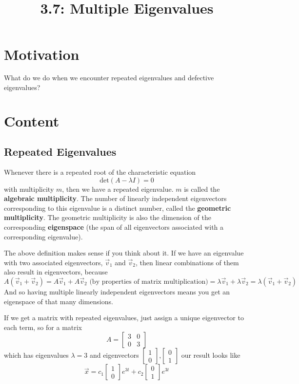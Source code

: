 \documentclass{article}
\title{3.7: Multiple Eigenvalues}
\begin{document}
\maketitle

\section{Motivation}
What do we do when we encounter repeated eigenvalues and defective eigenvalues?

\section{Content}

\subsection{Repeated Eigenvalues}

\begin{definition}
Whenever there is a repeated root of the characteristic equation $$\text{det}(A-\lambda I) = 0$$with multiplicity $m$, then we have a repeated eigenvalue. $m$ is called the \textbf{algebraic multiplicity}. The number of linearly independent eigenvectors corresponding to this eigenvalue is a distinct number, called the \textbf{geometric multiplicity}. The geometric multiplicity is also the dimension of the corresponding \textbf{eigenspace} (the span of all eigenvectors associated with a corresponding eigenvalue).  
\end{definition}
The above definition makes sense if you think about it. If we have an eigenvalue with two associated eigenvectors, $\vec{v}_1$ and $\vec{v}_2$, then linear combinations of them also result in eigenvectors, because $$A(\vec{v}_1 + \vec{v}_2) = A\vec{v}_1 + A\vec{v}_2 \text{ (by properties of matrix multiplication)} = \lambda\vec{v}_1 + \lambda\vec{v}_2 = \lambda(\vec{v}_1 + \vec{v}_2)$$And so having multiple linearly independent eigenvectors means you get an eigenspace of that many dimensions.

If we get a matrix with repeated eigenvalues, just assign a unique eigenvector to each term, so for a matrix $$A = \begin{bmatrix}
    3 & 0\\ 0 & 3
\end{bmatrix}$$which has eigenvalues $\lambda = 3$ and eigenvectors $\begin{bmatrix}
    1\\0
\end{bmatrix}$,$\begin{bmatrix}
    0\\1
\end{bmatrix}$ our result looks like $$\vec{x} = c_1\begin{bmatrix}
    1\\0
\end{bmatrix}e^{3t} + c_2 \begin{bmatrix}
    0\\1
\end{bmatrix}e^{3t}$$
\end{document}

